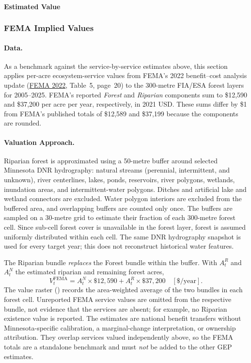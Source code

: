 \documentclass[11pt]{article}
\begin{document}
\paragraph{Estimated Value}


\subsubsection{FEMA Implied Values}

\paragraph{Data.}
As a benchmark against the service-by-service estimates above, this section applies per-acre ecosystem-service values from FEMA's 2022 benefit--cost analysis update (\href{https://www.fema.gov/sites/default/files/documents/fema_ecosystem-service-value-updates_2022.pdf}{FEMA 2022}, Table~5, page~20) to the 300-metre FIA/ESA forest layers for 2005--2025. FEMA's reported \emph{Forest} and \emph{Riparian} components sum to \$12,590 and \$37,200 per acre per year, respectively, in 2021 USD. These sums differ by \$1 from FEMA's published totals of \$12,589 and \$37,199 because the components are rounded.

\paragraph{Valuation Approach.}
Riparian forest is approximated using a 50-metre buffer around selected Minnesota DNR hydrography: natural streams (perennial, intermittent, and unknown), river centerlines, lakes, ponds, reservoirs, river polygons, wetlands, inundation areas, and intermittent-water polygons. Ditches and artificial lake and wetland connectors are excluded. Water polygon interiors are excluded from the buffered area, and overlapping buffers are counted only once. The buffers are sampled on a 30-metre grid to estimate their fraction of each 300-metre forest cell. Since sub-cell forest cover is unavailable in the forest layer, forest is assumed uniformly distributed within each cell. The same DNR hydrography snapshot is used for every target year; this does not reconstruct historical water features.

The Riparian bundle \emph{replaces} the Forest bundle within the buffer. With $A_t^R$ and $A_t^N$ the estimated riparian and remaining forest acres,
\[
V_t^{\mathrm{FEMA}} = A_t^N \times \$12{,}590 + A_t^R \times \$37{,}200
\quad [\$/\mathrm{year}].
\]
The value raster () records the area-weighted average of the two bundles in each forest cell. Unreported FEMA service values are omitted from the respective bundle, not evidence that the services are absent; for example, no Riparian existence value is reported. The estimates are national benefit transfers without Minnesota-specific calibration, a marginal-change interpretation, or ownership attribution. They overlap services valued independently above, so the FEMA totals are a standalone benchmark and must \emph{not} be added to the other GEP estimates.
\end{document}
